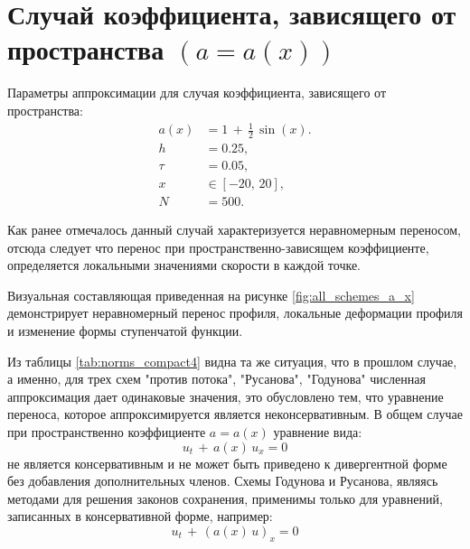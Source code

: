 \documentclass[a4paper,14pt]{extreport}
\begin{document}
\section*{{Случай коэффициента, зависящего от пространства $(a=a(x))$}}

Параметры аппроксимации для случая коэффициента, зависящего от пространства:
\[
\begin{aligned}
	a(x) &= 1\,+\,\frac{1}{2}\,\sin(x). \\
	h &= 0.25, \\
	\tau &= 0.05, \\
	x &\in [-20,\,20], \\
	N &= 500.
\end{aligned}
\]

Как ранее отмечалось данный случай характеризуется неравномерным переносом, отсюда следует что перенос при пространственно-зависящем коэффициенте, определяется локальными значениями скорости в каждой точке.

Визуальная составляющая приведенная на рисунке \ref{fig:all_schemes_a_x} демонстрирует неравномерный перенос профиля, локальные деформации профиля и изменение формы ступенчатой функции.

Из таблицы \ref{tab:norms_compact4} видна та же ситуация, что в прошлом случае, а именно, для трех схем "против потока", "Русанова", "Годунова" численная аппроксимация дает одинаковые значения, это обусловлено тем, что уравнение переноса, которое аппроксимируется является неконсервативным. В общем случае при пространственно коэффициенте $a=a(x)$ уравнение вида:
\begin{equation*}
	u_t\,+\,a(x)\,u_x=0
\end{equation*}
не является консервативным и не может быть приведено к дивергентной форме без добавления дополнительных членов. Схемы Годунова и Русанова, являясь методами для решения законов сохранения, применимы только для уравнений, записанных в консервативной форме, например:
\begin{equation*}
	u_t\,+\,(a(x)\,u)_x=0
\end{equation*}
\end{document}
